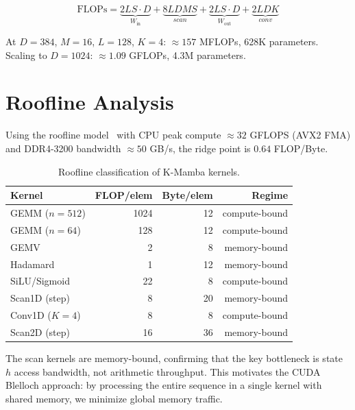 \documentclass[10pt,onecolumn]{article}
\begin{document}
\begin{equation}
  \text{FLOPs} = \underbrace{2LS \cdot D}_{W_\text{in}}
               + \underbrace{8LDMS}_{scan}
               + \underbrace{2LS \cdot D}_{W_\text{out}}
               + \underbrace{2LDK}_{conv}
\end{equation}

At $D = 384$, $M = 16$, $L = 128$, $K = 4$: $\approx 157$ MFLOPs,
628K parameters. Scaling to $D = 1024$: $\approx 1.09$ GFLOPs, 4.3M parameters.

\section{Roofline Analysis}
\label{sec:roofline}

Using the roofline model~\cite{williams2009roofline} with
CPU peak compute $\approx 32$ GFLOPS (AVX2 FMA) and
DDR4-3200 bandwidth $\approx 50$ GB/s,
the ridge point is $0.64$ FLOP/Byte.

\begin{table}[htbp]
\centering
\caption{Roofline classification of K-Mamba kernels.}
\label{tab:roofline}
\begin{tabular}{lrrr}
\toprule
Kernel & FLOP/elem & Byte/elem & Regime \\
\midrule
GEMM ($n{=}512$) & 1024 & 12 & compute-bound \\
GEMM ($n{=}64$)  & 128  & 12 & compute-bound \\
GEMV             & 2    & 8  & memory-bound \\
Hadamard         & 1    & 12 & memory-bound \\
SiLU/Sigmoid     & 22   & 8  & compute-bound \\
Scan1D (step)    & 8    & 20 & memory-bound \\
Conv1D ($K{=}4$) & 8    & 8  & compute-bound \\
Scan2D (step)    & 16   & 36 & memory-bound \\
\bottomrule
\end{tabular}
\end{table}

The scan kernels are memory-bound, confirming that the key bottleneck
is state $h$ access bandwidth, not arithmetic throughput.
This motivates the CUDA Blelloch approach: by processing the entire
sequence in a single kernel with shared memory, we minimize global
memory traffic.

\end{document}
